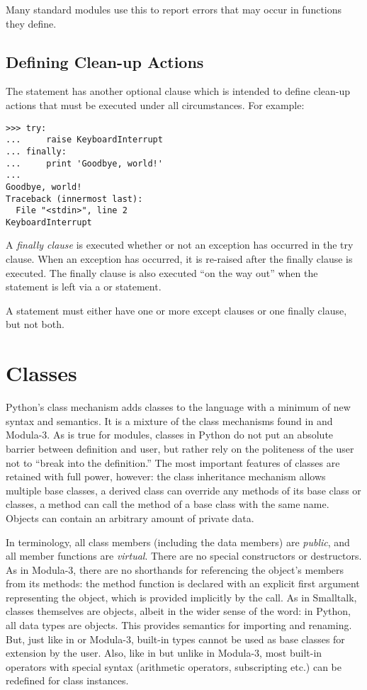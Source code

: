 \documentclass{manual}
\begin{document}
Many standard modules use this to report errors that may occur in
functions they define.


\section{Defining Clean-up Actions \label{cleanup}}

The  statement has another optional clause which is
intended to define clean-up actions that must be executed under all
circumstances.  For example:

\begin{verbatim}
>>> try:
...     raise KeyboardInterrupt
... finally:
...     print 'Goodbye, world!'
... 
Goodbye, world!
Traceback (innermost last):
  File "<stdin>", line 2
KeyboardInterrupt
\end{verbatim}

A \emph{finally clause} is executed whether or not an exception has
occurred in the try clause.  When an exception has occurred, it is
re-raised after the finally clause is executed.  The finally clause is
also executed ``on the way out'' when the  statement is
left via a  or  statement.

A  statement must either have one or more except clauses
or one finally clause, but not both.

\chapter{Classes \label{classes}}

Python's class mechanism adds classes to the language with a minimum
of new syntax and semantics.  It is a mixture of the class mechanisms
found in \Cpp{} and Modula-3.  As is true for modules, classes in Python
do not put an absolute barrier between definition and user, but rather
rely on the politeness of the user not to ``break into the
definition.''  The most important features of classes are retained
with full power, however: the class inheritance mechanism allows
multiple base classes, a derived class can override any methods of its
base class or classes, a method can call the method of a base class with the
same name.  Objects can contain an arbitrary amount of private data.

In \Cpp{} terminology, all class members (including the data members) are
\emph{public}, and all member functions are \emph{virtual}.  There are
no special constructors or destructors.  As in Modula-3, there are no
shorthands for referencing the object's members from its methods: the
method function is declared with an explicit first argument
representing the object, which is provided implicitly by the call.  As
in Smalltalk, classes themselves are objects, albeit in the wider
sense of the word: in Python, all data types are objects.  This
provides semantics for importing and renaming.  But, just like in \Cpp{}
or Modula-3, built-in types cannot be used as base classes for
extension by the user.  Also, like in \Cpp{} but unlike in Modula-3, most
built-in operators with special syntax (arithmetic operators,
subscripting etc.) can be redefined for class instances.
\end{document}
